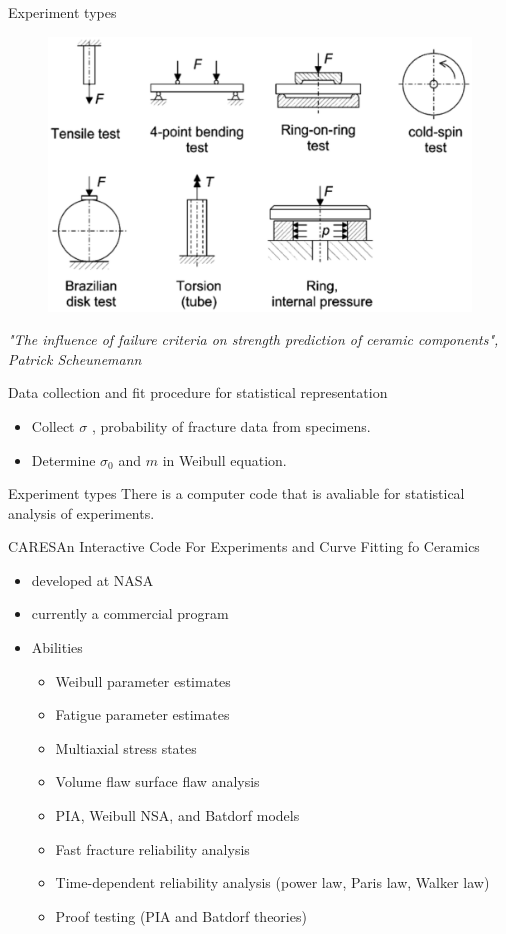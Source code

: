 \documentclass{beamer}
\begin{document}
\begin{frame}{Experiment types}{}
\begin{figure}
\centering
\includegraphics[width=0.7\linewidth]{./Images/experiments}
\label{fig:experiments}
\end{figure}
\emph{"The influence of failure criteria on strength prediction
of ceramic components", Patrick Scheunemann}
\end{frame}

\begin{frame}{Data collection and fit procedure for statistical representation}{}
\begin{itemize}
\item Collect $\sigma$ , probability of fracture data from specimens.
\item<2-> Determine $\sigma_0$ and $m$ in Weibull equation.
\end{itemize}
\end{frame}


\begin{frame}{Experiment types}
There is a computer code that is avaliable for statistical analysis of experiments.
\end{frame}

\begin{frame}{CARES}{An Interactive Code For Experiments and Curve Fitting fo Ceramics}
\begin{itemize}
\item developed at NASA
\item currently a commercial program
\item Abilities
\begin{itemize}
   \item Weibull parameter estimates
   \item Fatigue parameter estimates
   \item Multiaxial stress states
   \item Volume flaw  surface flaw analysis
   \item PIA, Weibull NSA, and Batdorf models
   \item Fast fracture reliability analysis
   \item Time-dependent reliability analysis (power law, Paris law, Walker law)
   \item Proof testing (PIA and Batdorf theories)
\end{itemize}\end{itemize}
\end{frame}
\end{document}
